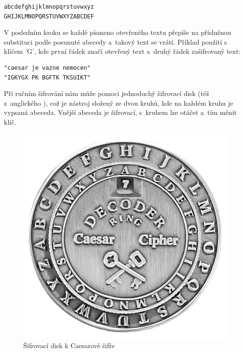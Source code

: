 \documentclass[glossaries, index]{kidiplom}
\begin{document}
\begin{center}
\begin{BVerbatim}
abcdefghijklmnopqrstuvwxyz
GHIJKLMNOPQRSTUVWXYZABCDEF
\end{BVerbatim}
\end{center}

V posledním kroku se každé písmeno otevřeného textu přepíše na příslušnou substituci podle posunuté abecedy a~takový text se vrátí. Příklad použití s klíčem 'G', kde první řádek značí otevřený text a~druhý řádek zašifrovaný text:\\

\begin{center}
\begin{BVerbatim}
"caesar je vazne nemocen"
"IGKYGX PK BGFTK TKSUIKT"
\end{BVerbatim}
\end{center}


Při ručním šifrování nám může pomoci jednoduchý šifrovací disk (též  z~anglického ), což je nástroj složený ze dvou kruhů, kde na každém kruhu je vypsaná abeceda. Vnější abeceda je šifrovací, s~kruhem lze otáčet a~tím měnit klíč.

\begin{figure}[htbp]
\centering
\includegraphics[scale=0.2]{graphics/ring_decoder.jpg}
\caption{Šifrovací disk k Caesarově šifře \cite{cipherdisk}}
\end{figure}
\end{document}
